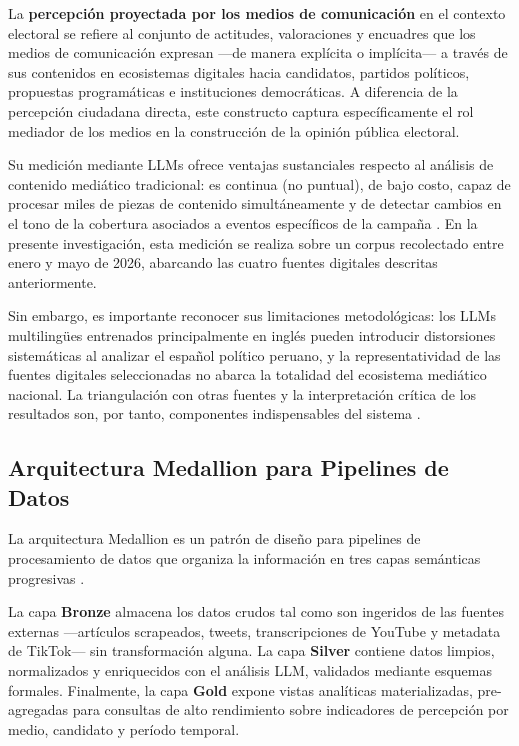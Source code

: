 La \textbf{percepción proyectada por los medios de comunicación} en el contexto electoral se refiere al conjunto de actitudes, valoraciones y encuadres que los medios de comunicación expresan —de manera explícita o implícita— a través de sus contenidos en ecosistemas digitales hacia candidatos, partidos políticos, propuestas programáticas e instituciones democráticas. A diferencia de la percepción ciudadana directa, este constructo captura específicamente el rol mediador de los medios en la construcción de la opinión pública electoral.

Su medición mediante LLMs ofrece ventajas sustanciales respecto al análisis de contenido mediático tradicional: es continua (no puntual), de bajo costo, capaz de procesar miles de piezas de contenido simultáneamente y de detectar cambios en el tono de la cobertura asociados a eventos específicos de la campaña \parencite{pr_gujral2024llm_elections}. En la presente investigación, esta medición se realiza sobre un corpus recolectado entre enero y mayo de 2026, abarcando las cuatro fuentes digitales descritas anteriormente.

Sin embargo, es importante reconocer sus limitaciones metodológicas: los LLMs multilingües entrenados principalmente en inglés pueden introducir distorsiones sistemáticas al analizar el español político peruano, y la representatividad de las fuentes digitales seleccionadas no abarca la totalidad del ecosistema mediático nacional. La triangulación con otras fuentes y la interpretación crítica de los resultados son, por tanto, componentes indispensables del sistema \parencite{pr_gujral2024llm_elections}.

\subsection{Arquitectura Medallion para Pipelines de Datos}

La arquitectura Medallion es un patrón de diseño para pipelines de procesamiento de datos que organiza la información en tres capas semánticas progresivas \parencite{bk_databricks2023medallion}.

La capa \textbf{Bronze} almacena los datos crudos tal como son ingeridos de las fuentes externas —artículos scrapeados, tweets, transcripciones de YouTube y metadata de TikTok— sin transformación alguna. La capa \textbf{Silver} contiene datos limpios, normalizados y enriquecidos con el análisis LLM, validados mediante esquemas formales. Finalmente, la capa \textbf{Gold} expone vistas analíticas materializadas, pre-agregadas para consultas de alto rendimiento sobre indicadores de percepción por medio, candidato y período temporal.

